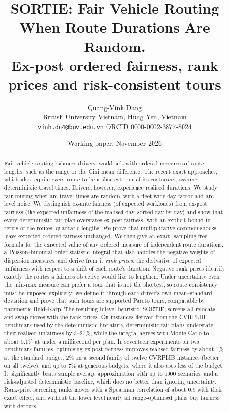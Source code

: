 \documentclass[11pt]{article}
\title{SORTIE: Fair Vehicle Routing When Route Durations Are Random.\\
\large Ex-post ordered fairness, rank prices and risk-consistent tours}
\author{Quang-Vinh Dang\\ British University Vietnam, Hung Yen, Vietnam\\
\texttt{vinh.dq4@buv.edu.vn} \quad ORCID 0000-0002-3877-8024}
\date{Working paper, November 2026}
\theoremstyle{definition}
\begin{document}
\maketitle

\begin{abstract}
Fair vehicle routing balances drivers' workloads with ordered measures of route
lengths, such as the range or the Gini mean difference. The recent exact
approaches, which also require every route to be a shortest tour of its
customers, assume deterministic travel times. Drivers, however, experience
realised durations. We study fair routing when arc travel times are random,
with a fleet-wide day factor and arc-level noise. We distinguish ex-ante
fairness (of expected workloads) from ex-post fairness (the expected
unfairness of the realised day, sorted day by day) and show that every
deterministic fair plan overstates ex-post fairness, with an explicit bound
in terms of the routes' quadratic lengths. We prove that multiplicative
common shocks leave expected ordered fairness unchanged. We then give an exact,
sampling-free formula for the expected value of any ordered measure of
independent route durations, a Poisson--binomial order-statistic integral that
also handles the negative weights of dispersion measures, and derive from it
\emph{rank prices}: the derivative of expected unfairness with respect to
a shift of each route's duration. Negative rank prices identify exactly the routes a
fairness objective would like to lengthen. Under uncertainty even the min-max
measure can prefer a tour that is not the shortest, so route consistency must
be imposed explicitly; we define it through each driver's own mean--standard
deviation and prove that such tours are supported Pareto tours, computable by
parametric Held--Karp. The resulting bilevel heuristic, SORTIE, screens all
relocate and swap moves with the rank prices. On instances derived from the
CVRPLIB benchmark used by the deterministic literature, deterministic fair
plans understate their realised unfairness by 8--27\%, while the integral agrees with Monte Carlo
to about $0.1\%$ at under a millisecond per plan.
In seventeen experiments on two benchmark families, optimising ex-post
fairness improves realised fairness by about $1\%$ at the standard budget,
$2\%$ on a second family of twelve CVRPLIB instances (better on all twelve),
and up to $7\%$ at generous budgets, where it also uses less of the budget. It
significantly beats sample average approximation with up to 1000 scenarios,
and a risk-adjusted deterministic baseline, which does no better than
ignoring uncertainty. Rank-price screening ranks moves with a Spearman
correlation of about $0.9$ with their exact effect, and without the lower
level nearly all range-optimised plans buy fairness with detours.
\end{abstract}
\end{document}
